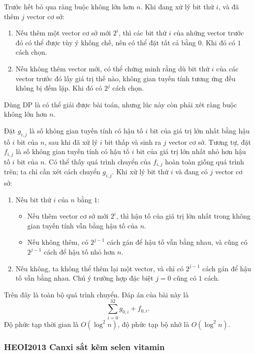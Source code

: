 \documentclass[11pt]{article}
\begin{document}
Trước hết bỏ qua ràng buộc không lớn hơn \(n\). Khi đang xử lý bit thứ \(i\), và
đã thêm \(j\) vector cơ sở:
\begin{enumerate}
  \item Nếu thêm một vector cơ sở mới \(2^i\), thì các bit thứ \(i\) của những
  vector trước đó có thể được tùy ý khống chế, nên có thể đặt tất cả bằng \(0\).
  Khi đó có \(1\) cách chọn.
  \item Nếu không thêm vector mới, có thể chứng minh rằng dù bit thứ \(i\) của
  các vector trước đó lấy giá trị thế nào, không gian tuyến tính tương ứng đều
  không bị đếm lặp. Khi đó có \(2^j\) cách chọn.
\end{enumerate}

Dùng DP là có thể giải được bài toán, nhưng lúc này còn phải xét ràng buộc không
lớn hơn \(n\).

Đặt \(g_{i,j}\) là số không gian tuyến tính có hậu tố \(i\) bit của giá trị lớn
nhất bằng hậu tố \(i\) bit của \(n\), sau khi đã xử lý \(i\) bit thấp và sinh ra
\(j\) vector cơ sở. Tương tự, đặt \(f_{i,j}\) là số không gian tuyến tính có hậu
tố \(i\) bit của giá trị lớn nhất nhỏ hơn hậu tố \(i\) bit của \(n\). Có thể thấy
quá trình chuyển của \(f_{i,j}\) hoàn toàn giống quá trình trên; ta chỉ cần xét
cách chuyển \(g_{i,j}\). Khi xử lý bit thứ \(i\) và đang có \(j\) vector cơ sở:

\begin{enumerate}
  \item Nếu bit thứ \(i\) của \(n\) bằng \(1\):
  \begin{itemize}
    \item Nếu thêm vector cơ sở mới \(2^i\), thì hậu tố của giá trị lớn nhất
    trong không gian tuyến tính vẫn bằng hậu tố của \(n\).
    \item Nếu không thêm, có \(2^{j-1}\) cách gán để hậu tố vẫn bằng nhau, và
    cũng có \(2^{j-1}\) cách để hậu tố nhỏ hơn \(n\).
  \end{itemize}
  \item Nếu không, ta không thể thêm lại một vector, và chỉ có \(2^{j-1}\) cách
  gán để hậu tố vẫn bằng nhau. Chú ý trường hợp đặc biệt \(j=0\) cũng có
  \(1\) cách.
\end{enumerate}

Trên đây là toàn bộ quá trình chuyển. Đáp án của bài này là
\[
  \sum_{i=0}^{32} g_{0,i}+f_{0,i}.
\]
Độ phức tạp thời gian là \(O(\log^2 n)\), độ phức tạp bộ nhớ là
\(O(\log^2 n)\).

\subsubsection{HEOI2013 Canxi sắt kẽm selen vitamin}
\end{document}
